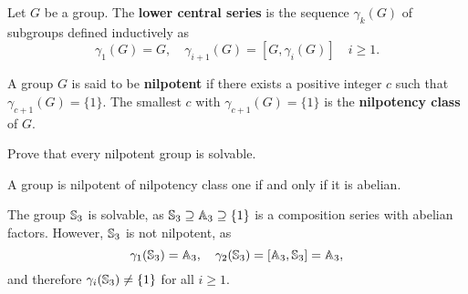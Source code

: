 

\begin{definition}
Let $G$ be a group. The \textbf{lower central series} 
is the sequence $\gamma_k(G)$ of subgroups defined inductively 
as 
\[
\gamma_1(G)=G,\quad
\gamma_{i+1}(G)=[G,\gamma_i(G)]\quad i\geq 1.
\]
\end{definition}

\begin{definition}
A group $G$ is said to be \textbf{nilpotent} if there exists a positive integer $c$ such that 
$\gamma_{c+1}(G)=\{1\}$. The smallest $c$ with $\gamma_{c+1}(G)=\{1\}$ is 
the \textbf{nilpotency class} of $G$.
\end{definition}

\begin{exercise}
\label{xca:nilpotent=>solvable}
Prove that every nilpotent group is solvable. 
\end{exercise}

A group is nilpotent of nilpotency class one if and only if it is abelian. 

\begin{example}
The group $\mathbb{S}_3$ is solvable, as 
$\mathbb{S}_3\supseteq \mathbb{A}_3\supseteq\{1\}$ is a composition series 
with abelian factors. However, $\mathbb{S}_3$ is not nilpotent, as 
\[
\gamma_1(\mathbb{S}_3)=\mathbb{A}_3,\quad
\gamma_2(\mathbb{S}_3)=[\mathbb{A}_3,\mathbb{S}_3]=\mathbb{A}_3, 
\]
and therefore $\gamma_i(\mathbb{S}_3)\ne\{1\}$ for all $i\geq1$. 
\end{example}

